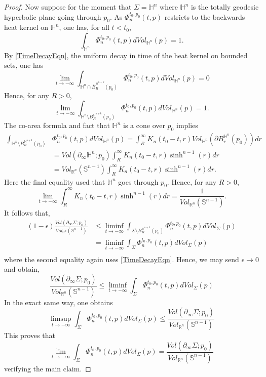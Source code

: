 \documentclass{amsart}
\theoremstyle{definition}
\theoremstyle{remark}
\numberwithin{equation}{section}
\newcommand{\Real}{\mathbb R}
\begin{document}
\begin{proof}
 Now suppose for the moment that $\Sigma=\mathbb{H}^n$ where $\mathbb{H}^n$ is the totally geodesic hyperbolic plane going through $p_0$. As $ \Phi_n^{t_0,p_0}(t,p) $ restricts to the backwards heat kernel on $\mathbb{H}^n$, one has, for all $t<t_0$,
 $$
 \int_{\mathbb{H}^n} \Phi_n^{t_0,p_0}(t,p) dVol_{\mathbb{H}^n}(p)=1.
 $$
 By \eqref{TimeDecayEqn}, the uniform decay in time of the heat kernel on bounded sets,  one has
 $$
 \lim_{t\to -\infty} \int_{\mathbb{H}^n\cap \bar{B}_R^{\mathbb{H}^{n+k}}(p_0)}  \Phi_n^{t_0,p_0}(t,p) dVol_{\mathbb{H}^n}(p)=0
 $$
 Hence, for any $R>0$,
 $$
 \lim_{t\to -\infty} \int_{\mathbb{H}^n\setminus {B}_R^{\mathbb{H}^{n+k}}(p_0)}  \Phi_n^{t_0,p_0}(t,p) dVol_{\mathbb{H}^n}(p)=1.
 $$
The co-area formula and fact that $\mathbb{H}^n$ is a cone over $p_0$ implies
 \begin{align*}
  \int_{\mathbb{H}^n\setminus {B}_R^{\mathbb{H}^{n+k}}(p_0)} & \Phi_n^{t_0,p_0}(t,p) dVol_{\mathbb{H}^n}(p) =\int_R^\infty K_n(t_0-t, r) Vol_{\mathbb{H}^{n}}(\partial {B}_r^{\mathbb{H}^{n}}(p_0)) dr\\
&=  Vol(\partial_\infty \mathbb{H}^n; p_0)\int_R^\infty K_n(t_0-t, r) \sinh^{n-1}(r) dr\\
  &=Vol_{\Real^{n}}(\mathbb{S}^{n-1})\int_R^\infty K_n(t_0-t, r) \sinh^{n-1}(r) dr.
\end{align*}
Here the final equality used that $\mathbb{H}^n$ goes through $p_0$.
Hence, for any $R>0$, 
$$
\lim_{t\to -\infty} \int_R^\infty K_n(t_0-t, r) \sinh^{n-1}(r) dr=\frac{1}{Vol_{\Real^{n}}(\mathbb{S}^{n-1})}.
$$
It follows that,
\begin{align*}
 (1-\epsilon) \frac{ Vol(\partial_\infty \Sigma; p_0) }{Vol_{\Real^{n}}(\mathbb{S}^{n-1})}&\leq \liminf_{t\to -\infty} \int_{\Sigma\setminus B_R^{\mathbb{H}^{n+k}}(p_0)} \Phi_n^{t_0,p_0}(t,p) dVol_\Sigma(p)\\
 &=\liminf_{t\to -\infty} \int_{\Sigma} \Phi_n^{t_0,p_0}(t,p) dVol_\Sigma(p)\\
\end{align*}
 where the second equality again uses \eqref{TimeDecayEqn}.
Hence, we may send $\epsilon \to 0$ and obtain,
$$
 \frac{ Vol(\partial_\infty \Sigma; p_0) }{Vol_{\Real^{n}}(\mathbb{S}^{n-1})}\leq \liminf_{t\to -\infty} \int_{\Sigma} \Phi_n^{t_0,p_0}(t,p) dVol_\Sigma(p)
$$
In the exact same way, one obtains
$$
 \limsup_{t\to -\infty} \int_{\Sigma} \Phi_n^{t_0,p_0}(t,p) dVol_\Sigma(p)\leq
\frac{ Vol(\partial_\infty \Sigma; p_0) }{Vol_{\Real^{n}}(\mathbb{S}^{n-1})}
$$
This proves that
$$
\lim_{t\to -\infty} \int_{\Sigma} \Phi_n^{t_0,p_0}(t,p) dVol_\Sigma(p)=
\frac{ Vol(\partial_\infty \Sigma; p_0) }{Vol_{\Real^{n}}(\mathbb{S}^{n-1})}
$$
verifying the main claim.  
\end{proof}
\end{document}
